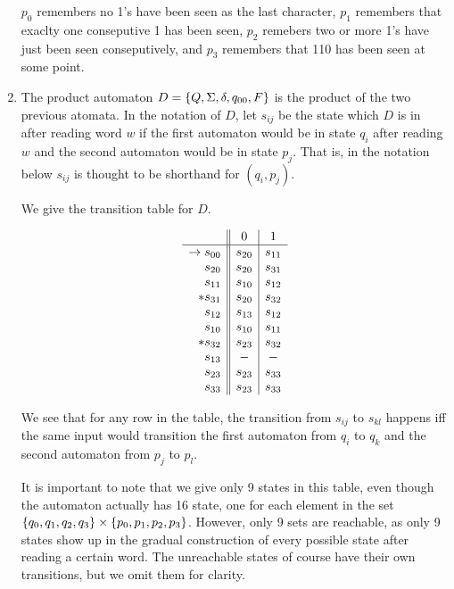 \documentclass{article}
\begin{document}
\begin{enumerate}
        $p_0$ remembers no 1's have been seen as the last character, $p_1$ remembers that exaclty one conseputive 1 has been seen, $p_2$ remebers two or more 1's have just been seen conseputively, and $p_3$ remembers that 110 has been seen at some point.

    \item
        The product automaton $D= \set{Q,\Sigma, \delta,q_{00}, F}$ is the product of the two previous atomata. In the notation of $D$, let $s_{ij}$ be the state which $D$ is in after reading word $w$ if the first automaton would be in state $q_i$ after reading $w$ and the second automaton would be in state $p_j$. That is, in the notation below $s_{ij}$ is thought to be shorthand for $(q_i, p_j)$.

        We give the transition table for $D$.

        \begin{align*}
            \begin{array}{r || c | c}
             & 0 & 1  \\ \hline
                \to s_{00} & s_{20} & s_{11} \\
                s_{20} & s_{20} & s_{31} \\
                s_{11} & s_{10} & s_{12} \\
               *s_{31} & s_{20} & s_{32} \\
                s_{12} & s_{13} & s_{12} \\
                s_{10} & s_{10} & s_{11} \\
               *s_{32} & s_{23} & s_{32} \\
                s_{13} & - & - \\
                s_{23} & s_{23} & s_{33} \\
                s_{33} & s_{23} & s_{33}
            \end{array}            
        \end{align*}

        We see that for any row in the table, the transition from $s_{ij}$ to $s_{kl}$ happens iff the same input would transition the first automaton from $q_i$ to $q_k$ and the second automaton from $p_j$ to $p_l$.

        It is important to note that we give only 9 states in this table, even though the automaton actually has 16 state, one for each element in the set $\set{q_0,q_1,q_2,q_3} \times \set{p_0,p_1,p_2,p_3}$. However, only 9 sets are reachable, as only 9 states show up in the gradual construction of every possible state after reading a certain word. The unreachable states of course have their own transitions, but we omit them for clarity.
        

\end{enumerate}
\end{document}
